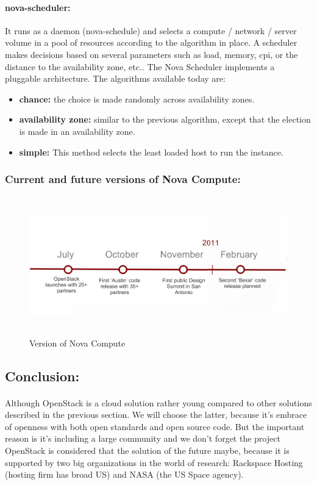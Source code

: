 \paragraph{nova-scheduler:}It runs as a daemon (nova-schedule) and selects a compute / network / server volume in a pool of resources according to the algorithm 
in place. A scheduler makes decisions based on several parameters such as load, memory, cpi, or the distance to the availability zone, etc..
The Nova Scheduler implements a pluggable architecture. The algorithms available today are:
\begin{itemize}
 \item \textbf{chance:} the choice is made randomly across availability zones.
 \item \textbf{availability zone:} similar to the previous algorithm, except that the election is made in an availability zone.
 \item \textbf{simple:} This method selects the least loaded host to run the instance.
\end{itemize}
\newpage
\subsubsection{Current and future versions of Nova Compute:}

\begin{figure}[!h]
\center 
\includegraphics[width=13cm, height=6cm]{./images/history.png}
 \caption{Version of Nova Compute}

\end{figure}
\subsection{Conclusion: }
\paragraph{} Although OpenStack is a cloud solution rather young compared to other solutions described in the previous section. 
We will choose the latter, because  it's embrace of openness with both open standards and open source code.
But the important reason is it's including a large community and we don't forget the project OpenStack is considered that the solution of the future maybe,
  because it is supported by two big organizations in the world of research: Rackspace Hosting (hosting firm has broad US) and NASA (the US Space agency).\par

